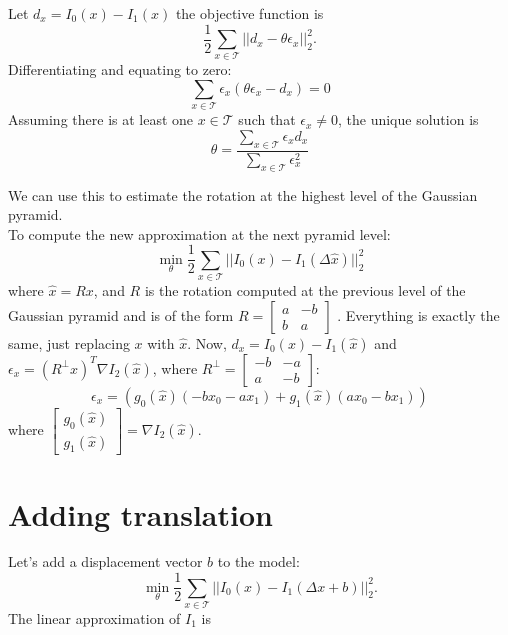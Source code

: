 \documentclass[11pt]{article}
\begin{document}
Let $d_{x} = I_{0}(x) - I_{1}(x)$ the objective function is
\begin{equation}
	\frac{1}{2}\sum_{x\in\mathcal{T}} ||d_{x} - \theta \epsilon_{x}||_{2}^{2}.
\end{equation}
Differentiating and equating to zero:
\begin{equation}
	\sum_{x\in\mathcal{T}} \epsilon_{x}(\theta \epsilon_{x} - d_{x}) =0
\end{equation}
Assuming there is at least one $x\in \mathcal{T}$ such that $\epsilon_{x} \neq 0$, the unique solution is
\begin{equation}
	\theta=\frac{\sum_{x\in \mathcal{T}}\epsilon_{x}d_{x} }{\sum_{x\in \mathcal{T}}\epsilon_{x}^{2}}
\end{equation}

We can use this to estimate the rotation at the highest level of the Gaussian pyramid.\\

To compute the new approximation at the next pyramid level:
\begin{equation}
	\min_{\theta} \frac{1}{2}\sum_{x\in\mathcal{T}} ||I_0(x) - I_1(\Delta \hat{x})||_{2}^{2}
\end{equation}
where $\hat{x} = Rx$, and $R$ is the rotation computed at the previous level of the Gaussian pyramid and is of the form $R = \left[\begin{array}{cc}a & -b \\ b & a\end{array}\right]$ . Everything is exactly the same, just replacing $x$ with $\hat{x}$. Now,
$d_{x}=I_{0}(x) - I_{1}(\hat{x})$ and $\epsilon_{x} = (R^{\perp}x)^T \nabla I_{2}(\hat{x})$, where $R^{\perp} = \left[\begin{array}{cc}-b & -a \\ a & -b\end{array}\right]$:
\begin{equation}
	 \epsilon_{x} = (g_{0}(\hat{x})(-bx_{0} - ax_{1}) + g_{1}(\hat{x})(ax_{0} - bx_{1}))
\end{equation}
where $\left[\begin{array}{c}g_{0}(\hat{x}) \\ g_{1}(\hat{x})\end{array}\right]=\nabla I_{2}(\hat{x})$.

\section{Adding translation}
Let's add a displacement vector $b$ to the model:
\begin{equation}
	\min_{\theta} \frac{1}{2}\sum_{x\in\mathcal{T}} ||I_0(x) - I_1(\Delta x + b)||_{2}^{2}.
\end{equation}
The linear approximation of $I_1$ is
\end{document}
